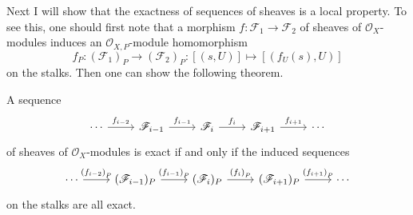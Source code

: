 Next I will show that the exactness of sequences of sheaves
is a local property. To see this, one should first note that a morphism
$f:\mathscr{F}_{1}\to\mathscr{F}_{2}$ of sheaves of
$\mathscr{O}_{X}$-modules induces an $\mathscr{O}_{X,P}$-module homomorphism
\[
  f_{P}:\left(\mathscr{F}_{1}\right)_{P}\to\left(\mathscr{F}_{2}\right)_{P}
  :[(s,U)]\mapsto [(f_{U}(s),U)]
\]
on the stalks. Then one can show the following theorem.
\begin{thm}\label{thm:ses_equivalence}
  A sequence
  \[\begin{tikzcd}
      \cdots\rar{f_{i-2}} & \mathscr{F}_{i-1}\rar{f_{i-1}}
      & \mathscr{F}_{i}\rar{f_{i}} & \mathscr{F}_{i+1}\rar{f_{i+1}} & \cdots
    \end{tikzcd}\]
  of sheaves of $\mathscr{O}_{X}$-modules is exact if and only if the
  induced sequences
  \[\begin{tikzcd}
      \cdots\rar{\left(f_{i-2}\right)_{P}}
      & (\mathscr{F}_{i-1})_{P}\rar{\left(f_{i-1}\right)_{P}}
      & (\mathscr{F}_{i})_{P}\rar{\left(f_{i}\right)_{P}}
      & (\mathscr{F}_{i+1})_{P}\rar{\left(f_{i+1}\right)_{P}} & \cdots
    \end{tikzcd}\]
  on the stalks are all exact.
\end{thm}
